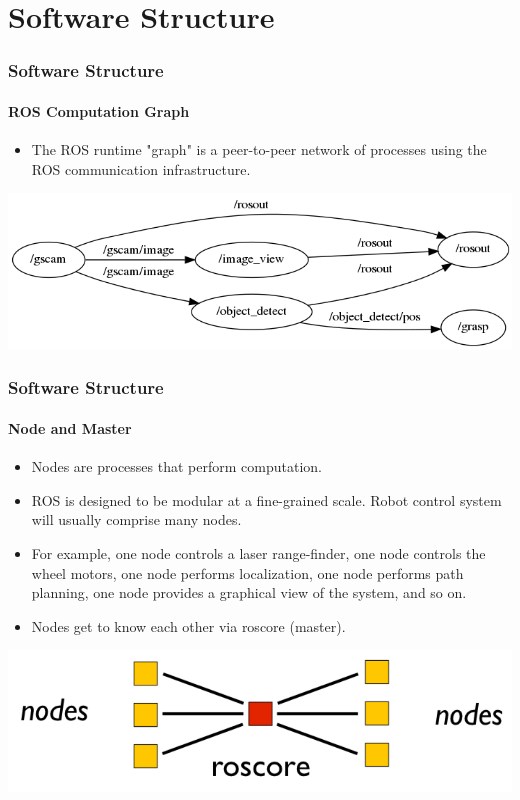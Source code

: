 \documentclass{beamer}
\begin{document}
\section{Software Structure}
\begin{frame}
\frametitle{Software Structure}
\framesubtitle{ROS Computation Graph}

\begin{itemize}
  \item The ROS runtime "graph" is a peer-to-peer network of processes using the ROS communication infrastructure.
\end{itemize}
\begin{center}
  \includegraphics[width=\textwidth]{comp_graph}
\end{center}

\end{frame}

\begin{frame}
\frametitle{Software Structure}
\framesubtitle{Node and Master}

\begin{itemize}
  \item Nodes are processes that perform computation. 
  \item ROS is designed to be modular at a fine-grained scale. Robot control system will usually comprise many nodes.
  \item For example, one node controls a laser range-finder, one node controls the wheel motors, one node performs localization, one node performs path planning, one node provides a graphical view of the system, and so on.
  \item Nodes get to know each other via roscore (master).
\end{itemize}

\begin{center}
  \includegraphics[width=.6\textwidth]{nodes}
\end{center}

\end{frame}
\end{document}
